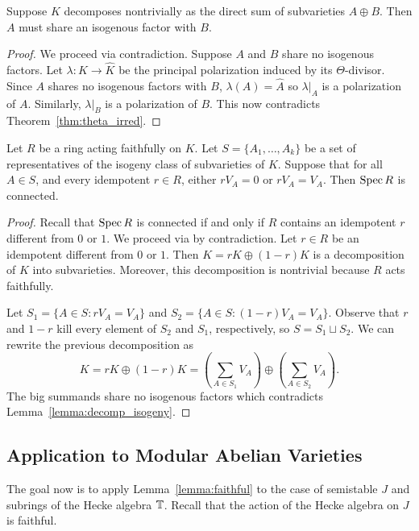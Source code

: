 \documentclass{article}
\begin{document}
\begin{lemma}
    \label{lemma:decomp_isogeny}
    Suppose $K$ decomposes nontrivially as the direct sum of subvarieties
    $A\oplus B$. Then $A$ must share an isogenous factor with $B$.
\end{lemma}
\begin{proof}
    We proceed via contradiction. Suppose $A$ and $B$ share no isogenous
    factors. Let $\lambda:K\to \hat{K}$ be the principal polarization induced
    by its $\Theta$-divisor. Since $A$ shares no isogenous factors with $B$,
    $\lambda(A)=\hat{A}$ so $\lambda|_A$ is a polarization of $A$. Similarly,
    $\lambda|_B$ is a polarization of $B$. This now contradicts
    Theorem~\ref{thm:theta_irred}.
\end{proof}

\begin{lemma}
    \label{lemma:faithful}
    Let $R$ be a ring acting faithfully on $K$. Let $S=\{A_1,\ldots,A_k\}$ be a
    set of representatives of the isogeny class of subvarieties of $K$. 
    Suppose that for all $A\in S$, and every idempotent $r\in R$, either
    $rV_A=0$ or $rV_A=V_A$. Then $\operatorname{Spec} R$ is connected.
\end{lemma}
\begin{proof}
    Recall that $\operatorname{Spec} R$ is connected if and only if $R$ contains an
    idempotent $r$ different from $0$ or $1$. We proceed via by contradiction. 
    Let $r\in R$ be an idempotent different from $0$ or $1$. Then $K = rK
    \oplus (1-r) K$ is a decomposition of $K$ into subvarieties. Moreover, this
    decomposition is nontrivial because $R$ acts faithfully.
    
    Let $S_1=\{A\in S:rV_A=V_A\}$ and $S_2=\{A\in S:(1-r)V_A=V_A\}$. Observe
    that $r$ and $1-r$ kill every element of $S_2$ and $S_1$, respectively, so
    $S=S_1\sqcup S_2$. We can rewrite the previous decomposition as
    \[
        K 
        = rK \oplus (1-r)K
        = \left(\sum_{A\in S_1} V_A \right)
        \oplus \left(\sum_{A\in S_2} V_A \right).
    \]
    The big summands share no isogenous factors which contradicts
    Lemma~\ref{lemma:decomp_isogeny}.
\end{proof}

\subsection{Application to Modular Abelian Varieties}

The goal now is to apply Lemma~\ref{lemma:faithful} to the case of semistable
$J$ and subrings of the Hecke algebra $\mathbb{T}$. Recall that the action of the
Hecke algebra on $J$ is faithful.
\end{document}
